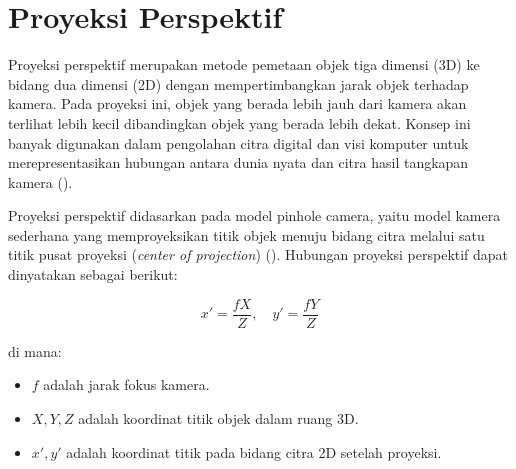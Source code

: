 
 

\section{Proyeksi Perspektif}

Proyeksi perspektif merupakan metode pemetaan objek tiga dimensi (3D) ke bidang dua dimensi (2D) dengan mempertimbangkan jarak objek terhadap kamera. Pada proyeksi ini, objek yang berada lebih jauh dari kamera akan terlihat lebih kecil dibandingkan objek yang berada lebih dekat.
Konsep ini banyak digunakan dalam pengolahan citra digital dan visi komputer untuk merepresentasikan hubungan antara dunia nyata dan citra hasil tangkapan kamera (\cite{Gonzalez2018}).

Proyeksi perspektif didasarkan pada model pinhole camera, yaitu model kamera sederhana yang memproyeksikan titik objek menuju bidang citra melalui satu titik pusat proyeksi (\emph{center of projection}) (\cite{Marschner2021}).
Hubungan proyeksi perspektif dapat dinyatakan sebagai berikut:

\begin{equation}
  x' = \frac{fX}{Z}, \quad y' = \frac{fY}{Z}
\end{equation}

di mana:
\begin{itemize}
  \item \(f\) adalah jarak fokus kamera.
  \item \(X, Y, Z\) adalah koordinat titik objek dalam ruang 3D.
  \item \(x', y'\) adalah koordinat titik pada bidang citra 2D setelah proyeksi.
\end{itemize}

